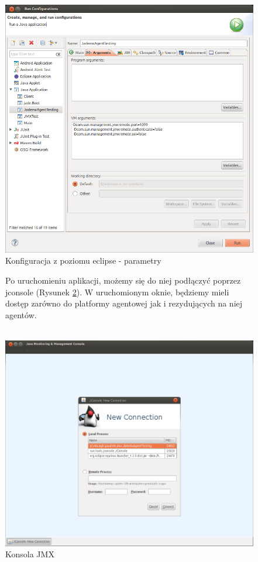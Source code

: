 \documentclass[a4paper,12pt]{article}
\begin{document}
\begin{figure}[!p]
\centering
\includegraphics[scale=0.5]{gfx/PlatformaWymianyDobr-img6.png}
\caption{Konfiguracja z poziomu eclipse - parametry}
\label{conf2}
\end{figure}

\begin{figure}[!p]
Po uruchomieniu aplikacji, możemy się do niej podłączyć poprzez jconsole (Rysunek \ref{conf3}). W uruchomionym oknie, będziemy mieli dostęp zarówno do platformy agentowej jak i rezydujących na niej agentów. 
\\ \\
\begin{center}
\includegraphics[scale=0.5]{gfx/PlatformaWymianyDobr-img7.png}
\caption{Konsola JMX}
\label{conf3}
\end{center}
\end{figure}
\end{document}
